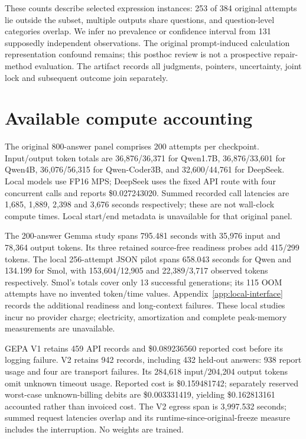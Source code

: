 These counts describe selected expression instances: 253 of 384 original attempts lie outside the subset, multiple outputs share questions, and question-level categories overlap. We infer no prevalence or confidence interval from 131 supposedly independent observations. The original prompt-induced calculation representation confound remains; this posthoc review is not a prospective repair-method evaluation. The artifact records all judgments, pointers, uncertainty, joint lock and subsequent outcome join separately.


\section{Available compute accounting}\label{app:compute-accounting}

The original 800-answer panel comprises 200 attempts per checkpoint. Input/output token totals are 36,876/36,371 for Qwen1.7B, 36,876/33,601 for Qwen4B, 36,076/56,315 for Qwen-Coder3B, and 32,600/44,761 for DeepSeek. Local models use FP16 MPS; DeepSeek uses the fixed API route with four concurrent calls and reports \$0.027243020. Summed recorded call latencies are 1,685, 1,889, 2,398 and 3,676 seconds respectively; these are not wall-clock compute times. Local start/end metadata is unavailable for that original panel.

The 200-answer Gemma study spans 795.481 seconds with 35,976 input and 78,364 output tokens. Its three retained source-free readiness probes add 415/299 tokens. The local 256-attempt JSON pilot spans 658.043 seconds for Qwen and 134.199 for Smol, with 153,604/12,905 and 22,389/3,717 observed tokens respectively. Smol's totals cover only 13 successful generations; its 115 OOM attempts have no invented token/time values. Appendix~\ref{app:local-interface} records the additional readiness and long-context failures. These local studies incur no provider charge; electricity, amortization and complete peak-memory measurements are unavailable.

GEPA V1 retains 459 API records and \$0.089236560 reported cost before its logging failure. V2 retains 942 records, including 432 held-out answers: 938 report usage and four are transport failures. Its 284,618 input/204,204 output tokens omit unknown timeout usage. Reported cost is \$0.159481742; separately reserved worst-case unknown-billing debits are \$0.003331419, yielding \$0.162813161 accounted rather than invoiced cost. The V2 egress span is 3,997.532 seconds; summed request latencies overlap and its runtime-since-original-freeze measure includes the interruption. No weights are trained.

